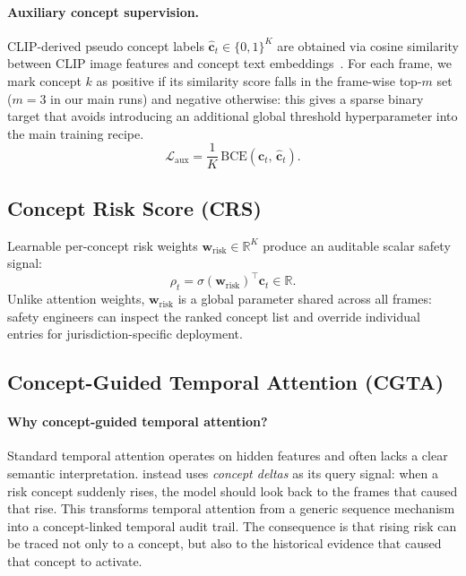 \paragraph{Auxiliary concept supervision.}
CLIP-derived pseudo concept labels $\hat{\mathbf{c}}_t \in \{0,1\}^K$
are obtained via cosine similarity between CLIP image features and
concept text embeddings~\citep{radford2021learning}. For each frame,
we mark concept $k$ as positive if its similarity score falls in the
frame-wise top-$m$ set ($m{=}3$ in our main runs) and negative otherwise:
this gives a sparse binary target that avoids introducing an additional
global threshold hyperparameter into the main training recipe.
\begin{equation}
  \mathcal{L}_{\text{aux}}
  = \frac{1}{K}\,\mathrm{BCE}(\mathbf{c}_t,\,\hat{\mathbf{c}}_t).
\end{equation}

\subsection{Concept Risk Score (CRS)}

Learnable per-concept risk weights $\mathbf{w}_{\text{risk}} \in \mathbb{R}^K$
produce an auditable scalar safety signal:
\begin{equation}
  \rho_t = \sigma(\mathbf{w}_{\text{risk}})^\top \mathbf{c}_t \in \mathbb{R}.
  \label{eq:crs}
\end{equation}
Unlike attention weights, $\mathbf{w}_{\text{risk}}$ is a global parameter
shared across all frames: safety engineers can inspect the ranked concept
list and override individual entries for jurisdiction-specific deployment.

\subsection{Concept-Guided Temporal Attention (CGTA)}

\paragraph{Why concept-guided temporal attention?}
Standard temporal attention operates on hidden features and often lacks
a clear semantic interpretation.
\cgta{} instead uses \emph{concept deltas} as its query signal:
when a risk concept suddenly rises, the model should look back to the
frames that caused that rise.
This transforms temporal attention from a generic sequence mechanism
into a concept-linked temporal audit trail.
The consequence is that rising risk can be traced not only to a concept,
but also to the historical evidence that caused that concept to activate.

